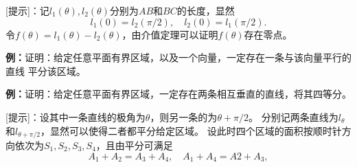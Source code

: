\begin{center}
\end{center}

[提示]：记$l_1(\theta),l_2(\theta)$分别为$AB$和$BC$的长度，显然
$$l_1(0)=l_2(\pi/2),\quad l_2(0)=l_1(\pi/2).$$
令$f(\theta)=l_1(\theta)-l_2(\theta)$，由介值定理可以证明$f(\theta)$存在零点。

{\bf 例：}证明：给定任意平面有界区域，以及一个向量，一定存在一条与该向量平行的直线
平分该区域。

{\bf 例：}证明：给定任意平面有界区域，一定存在两条相互垂直的直线，将其四等分。

[提示]：设其中一条直线的极角为$\theta$，则另一条的为$\theta+\pi/2$。
分别记两条直线为$l_{\theta}$和$l_{\theta+\pi/2}$，显然可以使得二者都平分给定区域。
设此时四个区域的面积按顺时针方向依次为$S_1,S_2,S_3,S_4$，且由平分可满足
$$A_1+A_2=A_3+A_4,\quad A_1+A_4=A2+A_3,$$

